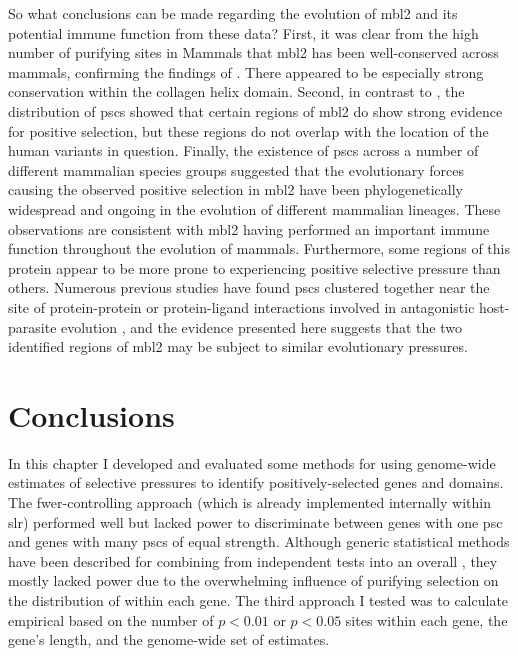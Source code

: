 So what conclusions can be made regarding the evolution of \ac{mbl2}
and its potential immune function from these \sw data? First, it was
clear from the high number of purifying sites in Mammals that
\ac{mbl2} has been well-conserved across mammals, confirming the
findings of \citet{Falzacappa2004}. There appeared to be especially
strong conservation within the collagen helix domain. Second, in
contrast to \citet{Falzacappa2004}, the distribution of \acp{psc}
showed that certain regions of \ac{mbl2} do show strong evidence for
positive selection, but these regions do not overlap with the location
of the human variants in question. Finally, the existence of \acp{psc}
across a number of different mammalian species groups suggested that
the evolutionary forces causing the observed positive selection in
\ac{mbl2} have been phylogenetically widespread and ongoing in the
evolution of different mammalian lineages. These observations are
consistent with \ac{mbl2} having performed an important immune
function throughout the evolution of mammals. Furthermore, some
regions of this protein appear to be more prone to experiencing
positive selective pressure than others.  Numerous previous studies
have found \acp{psc} clustered together near the site of
protein-protein or protein-ligand interactions involved in
antagonistic host-parasite evolution
\citep{Sawyer2005a,Kosiol2008,GuiraoRico2009,Huang2011}, and the
evidence presented here suggests that the two identified regions of
\ac{mbl2} may be subject to similar evolutionary pressures.

\section{Conclusions}

In this chapter I developed and evaluated some methods for using
genome-wide estimates of \sw selective pressures to identify
positively-selected genes and domains. The \acf{fwer}-controlling
approach (which is already implemented internally within \ac{slr})
performed well but lacked power to discriminate between genes with one
\ac{psc} and genes with many \acp{psc} of equal strength. Although
generic statistical methods have been described for combining \pvs
from independent tests into an overall \pv, they mostly lacked power
due to the overwhelming influence of purifying selection on the
distribution of \sw \pvs within each gene. The third approach I tested
was to calculate empirical \pvs based on the number of $p<0.01$ or
$p<0.05$ sites within each gene, the gene's length, and the
genome-wide set of \sw estimates.

